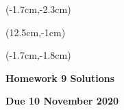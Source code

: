 \documentclass[12pt, oneside]{article}
\begin{document}
\begin{textblock*}{4cm}(-1.7cm,-2.3cm)
\end{textblock*}

\begin{textblock*}{8cm}(12.5cm,-1cm)
\end{textblock*}
\begin{textblock*}{13.5cm}(-1.7cm,-1.8cm)
\end{textblock*}

\vspace{1cm}

\begin{center}
\textbf{\Large Homework 9 Solutions}

\textbf{Due 10 November 2020}
\end{center}
\end{document}

